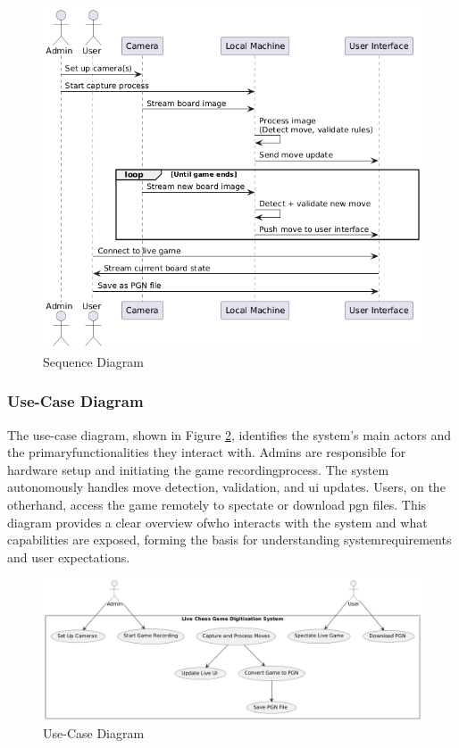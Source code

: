 
\begin{figure}[h!]
    \centering
    \includegraphics[width=\linewidth]{figures/results/uml/sequence.png}
    \caption[Sequence Diagram]{Sequence Diagram}
    \label{fig:sequence}
\end{figure}

\subsubsection*{Use-Case Diagram}
\label{subsubsec:use-case-diagram}

The use-case diagram, shown in Figure \ref{fig:use-case}, identifies the system’s main actors and the primaryfunctionalities they interact with. Admins are responsible for hardware setup and initiating the game recordingprocess. The system autonomously handles move detection, validation, and \gls{ui} updates. Users, on the otherhand, access the game remotely to spectate or download \gls{pgn} files. This diagram provides a clear overview ofwho interacts with the system and what capabilities are exposed, forming the basis for understanding systemrequirements and user expectations.

\begin{figure}[h!]
    \centering
    \includegraphics[width=\linewidth]{figures/results/uml/use-case.png}
    \caption{Use-Case Diagram}
    \label{fig:use-case}
\end{figure}  

